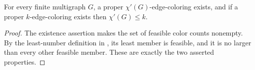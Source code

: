 \begin{lemma}
For every finite multigraph $G$, a proper $\chi'(G)$-edge-coloring exists,
and if a proper $k$-edge-coloring exists then $\chi'(G)\le k$.
\end{lemma}
\begin{proof}
The existence assertion  makes the set of feasible
color counts nonempty.  By the least-number definition in
, its least member is feasible, and it is no larger
than every other feasible member.  These are exactly the two asserted
properties.
\end{proof}
